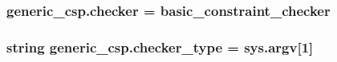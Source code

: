\subsubsection[{checker}]{\setlength{\rightskip}{0pt plus 5cm}generic\+\_\+csp.\+checker = basic\+\_\+constraint\+\_\+checker}\label{namespacegeneric__csp_aad82b685ed49341ad7a6f0a0b704370d}
\hypertarget{namespacegeneric__csp_ad0d33eb979837b91633c6b22fb471295}{}
\subsubsection[{checker\+\_\+type}]{\setlength{\rightskip}{0pt plus 5cm}string generic\+\_\+csp.\+checker\+\_\+type = sys.\+argv\mbox{[}1\mbox{]}}\label{namespacegeneric__csp_ad0d33eb979837b91633c6b22fb471295}
